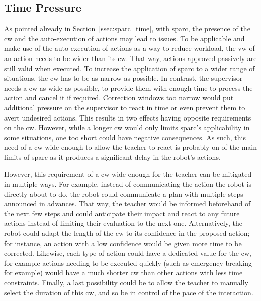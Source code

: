 \subsection{Time Pressure}
As pointed already in Section~\ref{ssec:sparc_time}, with \gls{sparc}, the presence of the \gls{cw} and the auto-execution of actions may lead to issues. To be applicable and make use of the auto-execution of actions as a way to reduce workload, the \gls{vw} of an action needs to be wider than its \gls{cw}. That way, actions approved passively are still valid when executed. To increase the application of \gls{sparc} to a wider range of situations, the \gls{cw} has to be as narrow as possible. In contrast, the supervisor needs a \gls{cw} as wide as possible, to provide them with enough time to process the action and cancel it if required. Correction windows too narrow would put additional pressure on the supervisor to react in time or even prevent them to avert undesired actions. %
This results in two effects having opposite requirements on the \gls{cw}. However, while a longer \gls{cw} would only limits \gls{sparc}'s applicability in some situations, one too short could have negative consequences. As such, this need of a \gls{cw} wide enough to allow the teacher to react is probably on of the main limits of \gls{sparc} as it produces a significant delay in the robot's actions. 

However, this requirement of a \gls{cw} wide enough for the teacher can be mitigated in multiple ways. For example, instead of communicating the action the robot is directly about to do, the robot could communicate a plan with multiple steps announced in advances. That way, the teacher would be informed beforehand of the next few steps and could anticipate their impact and react to any future actions instead of limiting their evaluation to the next one. Alternatively, the robot could adapt the length of the \gls{cw} to its confidence in the proposed action; for instance, an action with a low confidence would be given more time to be corrected. Likewise, each type of action could have a dedicated value for the \gls{cw}, for example actions needing to be executed quickly (such as emergency breaking for example) would have a much shorter \gls{cw} than other actions with less time constraints. Finally, a last possibility could be to allow the teacher to manually select the duration of this \gls{cw}, and so be in control of the pace of the interaction.


